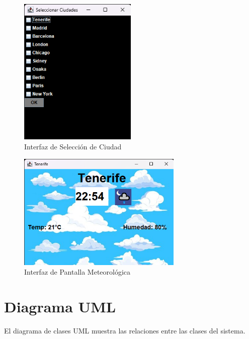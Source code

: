 \documentclass{article}
\begin{document}
\begin{figure}[H]
    \centering
    \includegraphics[width=0.5\textwidth]{Seleccion_ciudades.png}
    \caption{Interfaz de Selección de Ciudad}
    \label{fig:seleccion_ciudad}
\end{figure}

\begin{figure}[H]
    \centering
    \includegraphics[width=0.7\textwidth]{Pantalla.png}
    \caption{Interfaz de Pantalla Meteorológica}
    \label{fig:pantalla_meteorologica}
\end{figure}

\section{Diagrama UML}
El diagrama de clases UML muestra las relaciones entre las clases del sistema.
\end{document}
